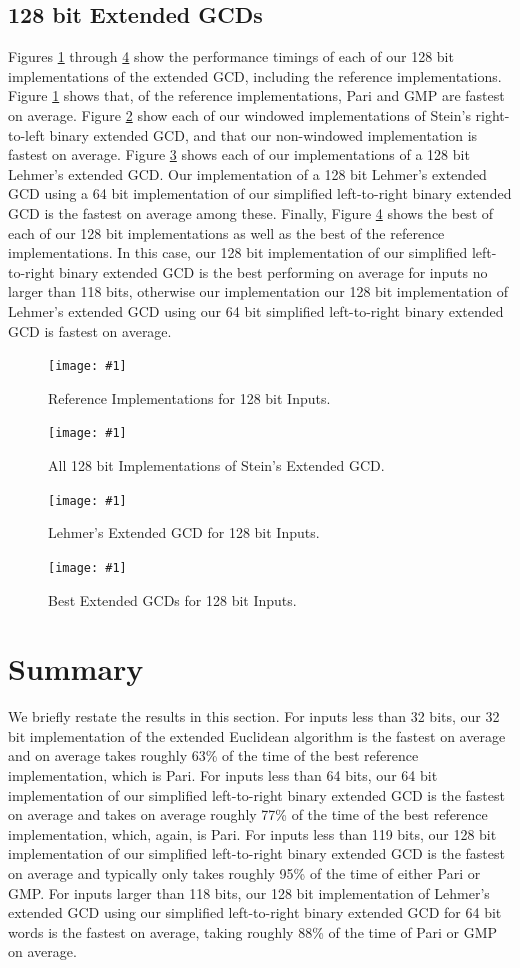 \documentclass{ucalgthes1}
\theoremstyle{definition}
\newcommand{\mygraph}[3]{
	\begin{figure}[htb]
	\centering
	\texttt{[image: \#1]}
	\caption{#3}
	\label{#2}
	\end{figure}
}
\begin{document}
\clearpage

\subsection{128 bit Extended GCDs}

Figures \ref{fig:gcdRef128} through \ref{fig:gcdBest128} show the performance timings of each of our 128 bit implementations of the extended GCD, including the reference implementations.  Figure \ref{fig:gcdRef128} shows that, of the reference implementations, Pari and GMP are fastest on average.  Figure \ref{fig:gcdSteins128} show each of our windowed implementations of Stein's right-to-left binary extended GCD, and that our non-windowed implementation is fastest on average.  Figure \ref{fig:gcdLehmer128} shows each of our implementations of a 128 bit Lehmer's extended GCD.  Our implementation of a 128 bit Lehmer's extended GCD using a 64 bit implementation of our simplified left-to-right binary extended GCD is the fastest on average among these.  Finally, Figure \ref{fig:gcdBest128} shows the best of each of our 128 bit implementations as well as the best of the reference implementations.  In this case, our 128 bit implementation of our simplified left-to-right binary extended GCD is the best performing on average for inputs no larger than 118 bits, otherwise our implementation our 128 bit implementation of Lehmer's extended GCD using our 64 bit simplified left-to-right binary extended GCD is fastest on average.

\mygraph{reference-impl-128}{fig:gcdRef128}{Reference Implementations for 128 bit Inputs.}
\mygraph{steins-128}{fig:gcdSteins128}{All 128 bit Implementations of Stein's Extended GCD.}
\mygraph{lehmer-128}{fig:gcdLehmer128}{Lehmer's Extended GCD for 128 bit Inputs.}
\mygraph{best-128}{fig:gcdBest128}{Best Extended GCDs for 128 bit Inputs.}

\clearpage


\section{Summary}

We briefly restate the results in this section.  For inputs less than 32 bits, our 32 bit implementation of the extended Euclidean algorithm is the fastest on average and on average takes roughly 63\% of the time of the best reference implementation, which is Pari.  For inputs less than 64 bits, our 64 bit implementation of our simplified left-to-right binary extended GCD is the fastest on average and takes on average roughly 77\% of the time of the best reference implementation, which, again, is Pari.  For inputs less than 119 bits, our 128 bit implementation of our simplified left-to-right binary extended GCD is the fastest on average and typically only takes roughly 95\% of the time of either Pari or GMP.  For inputs larger than 118 bits, our 128 bit implementation of Lehmer's extended GCD using our simplified left-to-right binary extended GCD for 64 bit words is the fastest on average, taking roughly 88\% of the time of Pari or GMP on average.
\end{document}
